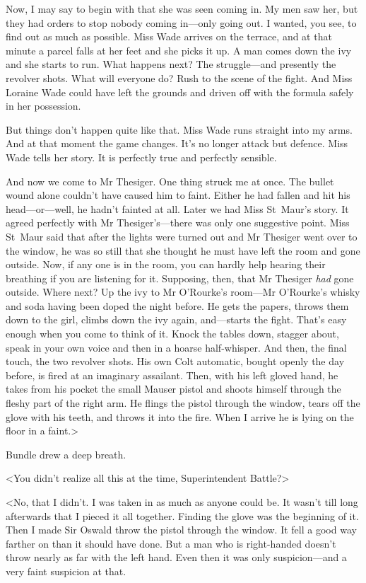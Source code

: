 Now, I may say to begin with that she was seen coming in. My men saw her, but they had orders to stop nobody coming in—only going out. I wanted, you see, to find out as much as possible. Miss Wade arrives on the terrace, and at that minute a parcel falls at her feet and she picks it up. A man comes down the ivy and she starts to run. What happens next? The struggle—and presently the revolver shots. What will everyone do? Rush to the scene of the fight. And Miss Loraine Wade could have left the grounds and driven off with the formula safely in her possession.

But things don't happen quite like that. Miss Wade runs straight into my arms. And at that moment the game changes. It's no longer attack but defence. Miss Wade tells her story. It is perfectly true and perfectly sensible.

And now we come to Mr Thesiger. One thing struck me at once. The bullet wound alone couldn't have caused him to faint. Either he had fallen and hit his head—or—well, he hadn't fainted at all. Later we had Miss St~Maur's story. It agreed perfectly with Mr Thesiger's—there was only one suggestive point. Miss St~Maur said that after the lights were turned out and Mr Thesiger went over to the window, he was so still that she thought he must have left the room and gone outside. Now, if any one is in the room, you can hardly help hearing their breathing if you are listening for it. Supposing, then, that Mr Thesiger \emph{had} gone outside. Where next? Up the ivy to Mr O'Rourke's room—Mr O'Rourke's whisky and soda having been doped the night before. He gets the papers, throws them down to the girl, climbs down the ivy again, and—starts the fight. That's easy enough when you come to think of it. Knock the tables down, stagger about, speak in your own voice and then in a hoarse half-whisper. And then, the final touch, the two revolver shots. His own Colt automatic, bought openly the day before, is fired at an imaginary assailant. Then, with his left gloved hand, he takes from his pocket the small Mauser pistol and shoots himself through the fleshy part of the right arm. He flings the pistol through the window, tears off the glove with his teeth, and throws it into the fire. When I arrive he is lying on the floor in a faint.>

Bundle drew a deep breath.

<You didn't realize all this at the time, Superintendent Battle?>

<No, that I didn't. I was taken in as much as anyone could be. It wasn't till long afterwards that I pieced it all together. Finding the glove was the beginning of it. Then I made Sir Oswald throw the pistol through the window. It fell a good way farther on than it should have done. But a man who is right-handed doesn't throw nearly as far with the left hand. Even then it was only suspicion—and a very faint suspicion at that.

